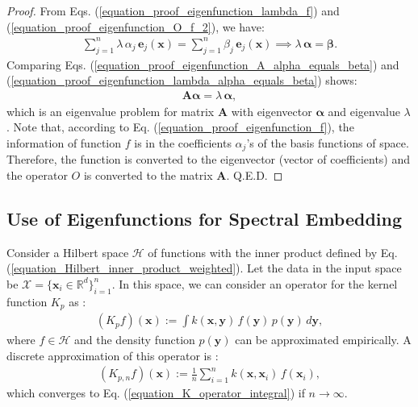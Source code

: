 \documentclass[lang=cn,10pt]{gorgeousnbook}
\numberwithin{equation}{section}%
\numberwithin{figure}{section}%
\begin{document}
\begin{proof}
From Eqs. (\ref{equation_proof_eigenfunction_lambda_f}) and (\ref{equation_proof_eigenfunction_O_f_2}), we have:
\begin{align}\label{equation_proof_eigenfunction_lambda_alpha_equals_beta}
\sum_{j=1}^n \lambda\, \alpha_j\, \boldsymbol{e}_j(\boldsymbol{x}) = \sum_{j=1}^n \beta_j\, \boldsymbol{e}_j(\boldsymbol{x}) \implies \lambda\, \boldsymbol{\alpha} = \boldsymbol{\beta}.
\end{align}
Comparing Eqs. (\ref{equation_proof_eigenfunction_A_alpha_equals_beta}) and (\ref{equation_proof_eigenfunction_lambda_alpha_equals_beta}) shows:
\begin{align*}
\boldsymbol{A} \boldsymbol{\alpha} = \lambda\, \boldsymbol{\alpha},
\end{align*}
which is an eigenvalue problem for matrix $\boldsymbol{A}$ with eigenvector $\boldsymbol{\alpha}$ and eigenvalue $\lambda$ \cite{ghojogh2019eigenvalue}. 
Note that, according to Eq. (\ref{equation_proof_eigenfunction_f}), the information of function $f$ is in the coefficients $\alpha_j$'s of the basis functions of space. Therefore, the function is converted to the eigenvector (vector of coefficients) and the operator $O$ is converted to the matrix $\boldsymbol{A}$. Q.E.D.
\end{proof}

\subsection{Use of Eigenfunctions for Spectral Embedding}\label{section_eigenfunctions_for_spectral_embedding}

Consider a Hilbert space $\mathcal{H}$ of functions with the inner product defined by Eq. (\ref{equation_Hilbert_inner_product_weighted}). Let the data in the input space be $\mathcal{X} = \{\boldsymbol{x}_i \in \mathbb{R}^d\}_{i=1}^n$.
In this space, we can consider an operator for the kernel function $K_p$ as \cite{williams2000effect}:
\begin{align}\label{equation_K_operator_integral}
(K_p f)(\boldsymbol{x}) := \int k(\boldsymbol{x},\boldsymbol{y})\, f(\boldsymbol{y})\, p(\boldsymbol{y})\, d\boldsymbol{y},
\end{align}
where $f \in \mathcal{H}$ and the density function $p(\boldsymbol{y})$ can be approximated empirically. 
A discrete approximation of this operator is \cite{williams2000effect}:
\begin{align}\label{equation_discrete_kernel_operator}
(K_{p,n} f)(\boldsymbol{x}) := \frac{1}{n} \sum_{i=1}^n k(\boldsymbol{x},\boldsymbol{x}_i)\, f(\boldsymbol{x}_i),
\end{align}
which converges to Eq. (\ref{equation_K_operator_integral}) if $n \rightarrow \infty$. 
\end{document}
